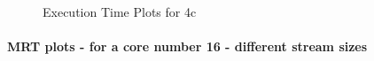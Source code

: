 \documentclass[12pt,a4paper]{article}
\begin{document}
\begin{figure}[H]
    \vspace{0.5cm} %


    \caption{Execution Time Plots for 4c}
    \label{img:exps-read-input-variants}
\end{figure}

\paragraph{MRT plots - for a core number 16 - different stream sizes\\}
\newpage
\end{document}
